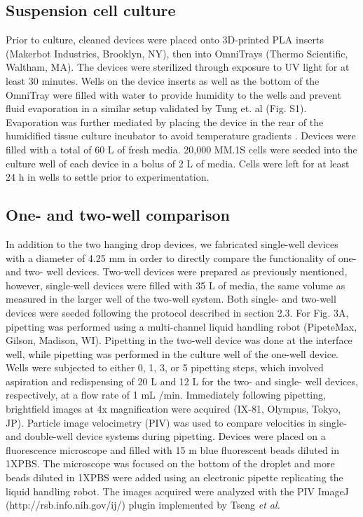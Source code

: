 \subsection{Suspension cell culture}
Prior to culture, cleaned devices were placed onto 3D-printed PLA inserts (Makerbot Industries, Brooklyn, NY), then into OmniTrays (Thermo Scientific, Waltham, MA). The devices were sterilized through exposure to UV light for at least 30 minutes. Wells on the device inserts as well as the bottom of the OmniTray were filled with water to provide humidity to the wells and prevent fluid evaporation in a similar setup validated by Tung et. al \cite{Tung2011} (Fig. S1). Evaporation was further mediated by placing the device in the rear of the humidified tissue culture incubator to avoid temperature gradients \cite{Berthier2008}. Devices were filled with a total of 60 \textmu L of fresh media. 20,000 MM.1S cells were seeded into the culture well of each device in a bolus of 2 \textmu L of media. Cells were left for at least 24 h in wells to settle prior to experimentation.  

\subsection{One- and two-well comparison}
In addition to the two hanging drop devices, we fabricated single-well devices with a diameter of 4.25 mm in order to directly compare the functionality of one- and two- well devices. Two-well devices were prepared as previously mentioned, however, single-well devices were filled with 35 \textmu L of media, the same volume as measured in the larger well of the two-well system. Both single- and two-well devices were seeded following the protocol described in section 2.3. 
For Fig. 3A, pipetting was performed using a multi-channel liquid handling robot (PipeteMax, Gilson, Madison, WI). Pipetting in the two-well device was done at the interface well, while pipetting was performed in the culture well of the one-well device. Wells were subjected to either 0, 1, 3, or 5 pipetting steps, which involved aspiration and redispensing of 20 \textmu L and 12 \textmu L for the two- and single- well devices, respectively, at a flow rate of 1 mL /min. Immediately following pipetting, brightfield images at 4x magnification were acquired (IX-81, Olympus, Tokyo, JP).
Particle image velocimetry (PIV) was used to compare velocities in single- and double-well device systems during pipetting. Devices were placed on a fluorescence microscope and filled with 15 m blue fluorescent beads diluted in 1XPBS. The microscope was focused on the bottom of the droplet and more beads diluted in 1XPBS were added using an electronic pipette replicating the liquid handling robot. The images acquired were analyzed with the PIV ImageJ (http://rsb.info.nih.gov/ij/) plugin implemented by Tseng \textit{et al.}  \cite{Tseng2012}

